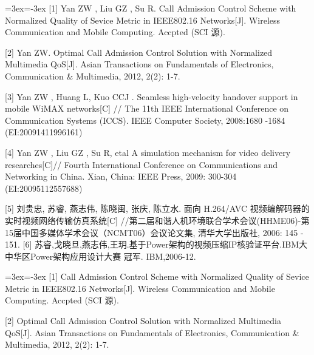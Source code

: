 \documentclass[
    doctor,
    truefont,
    pdflinks,
    ]{xjtuthesis}
\def\authornames{\BlindPeerReviewOFF}
\def\swithON{\BlindPeerReviewOFF}
\def\authornames{\BlindPeerReview}
\def\swithON{\BlindPeerReviewON}
\begin{document}
\begin{spacing}{1.2}
\ifx\authornames\swithON
{\wuhao \leftskip=3ex\parindent=-3ex
[1] Yan  ZW , Liu GZ , Su R. Call Admission Control Scheme with Normalized Quality of Sevice Metric in IEEE802.16 Networks[J].  Wireless Communication and Mobile Computing.  Accpted (SCI 源).

[2] Yan ZW. Optimal Call Admission Control Solution with Normalized Multimedia QoS[J]. Asian Transactions on Fundamentals of Electronics, Communication \& Multimedia, 2012, 2(2): 1-7.


[3] Yan ZW ,  Huang L, Kuo CCJ .   Seamless high-velocity handover support in mobile WiMAX networks[C] //  The 11th IEEE  International Conference on Communication Systems (ICCS).  IEEE Computer Society, 2008:1680 -1684 (EI:20091411996161)

[4] Yan  ZW , Liu GZ , Su R, etal  A simulation
mechanism for video delivery researches[C]// Fourth International Conference on Communications and Networking in China. Xian, China: IEEE Press, 2009: 300-304 (EI:20095112557688)

[5] 刘贵忠, 苏睿, 燕志伟, 陈晓闽, 张庆, 陈立水.  面向 H.264/AVC 视频编解码器的实时视频网络传输仿真系统[C] //第二届和谐人机环境联合学术会议(HHME06)-第15届中国多媒体学术会议（NCMT06）会议论文集, 清华大学出版社, 2006: 145 - 151.
[6]  苏睿,戈晓旦,燕志伟,王玥.基于Power架构的视频压缩IP核验证平台.IBM大中华区Power架构应用设计大赛 冠军. IBM,2006-12.
}
\else
{\wuhao \leftskip=3ex\parindent=-3ex
[1] Call Admission Control Scheme with Normalized Quality of Sevice Metric in IEEE802.16 Networks[J].  Wireless Communication and Mobile Computing.  Accpted (SCI 源).

[2] Optimal Call Admission Control Solution with Normalized Multimedia QoS[J]. Asian Transactions on Fundamentals of Electronics, Communication \& Multimedia, 2012, 2(2): 1-7.


}
\end{spacing}
\end{document}
